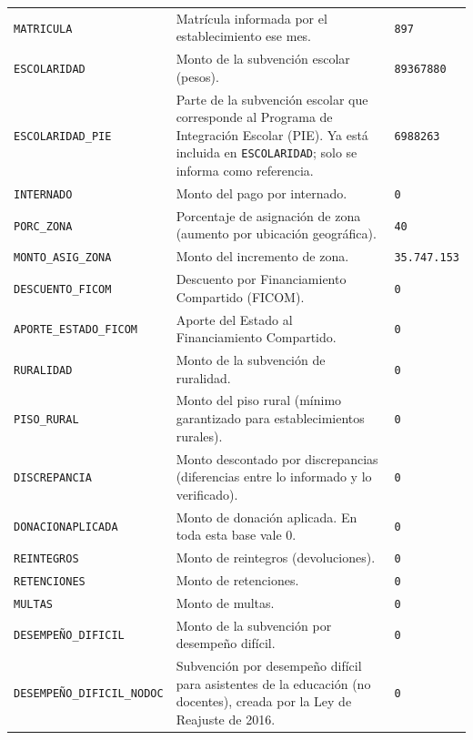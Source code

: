 \documentclass[10.5pt]{article}
\begin{document}
\begin{xltabular}{\linewidth}{@{}p{4.5cm} >{\raggedright\arraybackslash}X p{3.4cm}@{}}
\texttt{MATRICULA} & Matrícula informada por el establecimiento ese mes. & \texttt{897} \\
\texttt{ESCOLARIDAD} & Monto de la subvención escolar (pesos). & \texttt{89367880} \\
\texttt{ESCOLARIDAD\_\allowbreak{}PIE} & Parte de la subvención escolar que corresponde al Programa de Integración Escolar (PIE). Ya está incluida en \texttt{ESCOLARIDAD}; solo se informa como referencia. & \texttt{6988263} \\
\texttt{INTERNADO} & Monto del pago por internado. & \texttt{0} \\
\texttt{PORC\_\allowbreak{}ZONA} & Porcentaje de asignación de zona (aumento por ubicación geográfica). & \texttt{40} \\
\texttt{MONTO\_\allowbreak{}ASIG\_\allowbreak{}ZONA} & Monto del incremento de zona. & \texttt{35.747.153} \\
\texttt{DESCUENTO\_\allowbreak{}FICOM} & Descuento por Financiamiento Compartido (FICOM). & \texttt{0} \\
\texttt{APORTE\_\allowbreak{}ESTADO\_\allowbreak{}FICOM} & Aporte del Estado al Financiamiento Compartido. & \texttt{0} \\
\texttt{RURALIDAD} & Monto de la subvención de ruralidad. & \texttt{0} \\
\texttt{PISO\_\allowbreak{}RURAL} & Monto del piso rural (mínimo garantizado para establecimientos rurales). & \texttt{0} \\
\texttt{DISCREPANCIA} & Monto descontado por discrepancias (diferencias entre lo informado y lo verificado). & \texttt{0} \\
\texttt{DONACIONAPLICADA} & Monto de donación aplicada. En toda esta base vale 0. & \texttt{0} \\
\texttt{REINTEGROS} & Monto de reintegros (devoluciones). & \texttt{0} \\
\texttt{RETENCIONES} & Monto de retenciones. & \texttt{0} \\
\texttt{MULTAS} & Monto de multas. & \texttt{0} \\
\texttt{DESEMPEÑO\_\allowbreak{}DIFICIL} & Monto de la subvención por desempeño difícil. & \texttt{0} \\
\texttt{DESEMPEÑO\_\allowbreak{}DIFICIL\_\allowbreak{}NODOC} & Subvención por desempeño difícil para asistentes de la educación (no docentes), creada por la Ley de Reajuste de 2016. & \texttt{0} \\

\end{xltabular}
\end{document}

